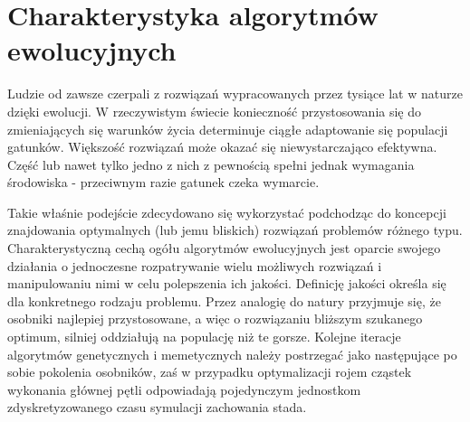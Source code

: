 \chapter{Charakterystyka algorytmów ewolucyjnych}
\par
Ludzie od zawsze czerpali z rozwiązań wypracowanych przez tysiące lat w naturze dzięki ewolucji. W rzeczywistym świecie konieczność przystosowania się do zmieniających się warunków życia determinuje ciągłe adaptowanie się populacji gatunków. Większość rozwiązań może okazać się niewystarczająco efektywna. Część lub nawet tylko jedno z nich z pewnością spełni jednak wymagania środowiska - przeciwnym razie gatunek czeka wymarcie. 
\par
Takie właśnie podejście zdecydowano się wykorzystać podchodząc do koncepcji znajdowania optymalnych (lub jemu bliskich) rozwiązań problemów różnego typu. Charakterystyczną cechą ogółu algorytmów ewolucyjnych jest oparcie swojego działania o jednoczesne rozpatrywanie wielu możliwych rozwiązań i manipulowaniu nimi w celu polepszenia ich jakości. Definicję jakości określa się dla konkretnego rodzaju problemu. Przez analogię do natury przyjmuje się, że osobniki najlepiej przystosowane, a więc o rozwiązaniu bliższym szukanego optimum, silniej oddziałują na populację niż te gorsze. Kolejne iteracje algorytmów genetycznych i memetycznych należy postrzegać jako następujące po sobie pokolenia osobników, zaś w przypadku optymalizacji rojem cząstek wykonania głównej pętli odpowiadają pojedynczym jednostkom zdyskretyzowanego czasu symulacji zachowania stada. 
